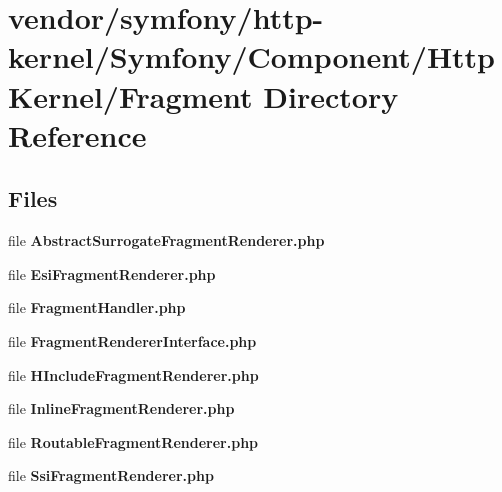 \section{vendor/symfony/http-\/kernel/\+Symfony/\+Component/\+Http\+Kernel/\+Fragment Directory Reference}
\label{dir_3503547011cec3c6edae60051b421100}
\subsection*{Files}
\begin{DoxyCompactItemize}
\item 
file {\bf Abstract\+Surrogate\+Fragment\+Renderer.\+php}
\item 
file {\bf Esi\+Fragment\+Renderer.\+php}
\item 
file {\bf Fragment\+Handler.\+php}
\item 
file {\bf Fragment\+Renderer\+Interface.\+php}
\item 
file {\bf H\+Include\+Fragment\+Renderer.\+php}
\item 
file {\bf Inline\+Fragment\+Renderer.\+php}
\item 
file {\bf Routable\+Fragment\+Renderer.\+php}
\item 
file {\bf Ssi\+Fragment\+Renderer.\+php}
\end{DoxyCompactItemize}
